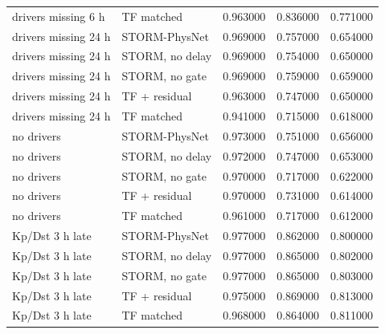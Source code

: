 \begin{tabular}{llrrr}
drivers missing 6 h & TF matched & 0.963000 & 0.836000 & 0.771000 \\
drivers missing 24 h & STORM-PhysNet & 0.969000 & 0.757000 & 0.654000 \\
drivers missing 24 h & STORM, no delay & 0.969000 & 0.754000 & 0.650000 \\
drivers missing 24 h & STORM, no gate & 0.969000 & 0.759000 & 0.659000 \\
drivers missing 24 h & TF + residual & 0.963000 & 0.747000 & 0.650000 \\
drivers missing 24 h & TF matched & 0.941000 & 0.715000 & 0.618000 \\
no drivers & STORM-PhysNet & 0.973000 & 0.751000 & 0.656000 \\
no drivers & STORM, no delay & 0.972000 & 0.747000 & 0.653000 \\
no drivers & STORM, no gate & 0.970000 & 0.717000 & 0.622000 \\
no drivers & TF + residual & 0.970000 & 0.731000 & 0.614000 \\
no drivers & TF matched & 0.961000 & 0.717000 & 0.612000 \\
Kp/Dst 3 h late & STORM-PhysNet & 0.977000 & 0.862000 & 0.800000 \\
Kp/Dst 3 h late & STORM, no delay & 0.977000 & 0.865000 & 0.802000 \\
Kp/Dst 3 h late & STORM, no gate & 0.977000 & 0.865000 & 0.803000 \\
Kp/Dst 3 h late & TF + residual & 0.975000 & 0.869000 & 0.813000 \\
Kp/Dst 3 h late & TF matched & 0.968000 & 0.864000 & 0.811000 \\
\bottomrule
\end{tabular}
